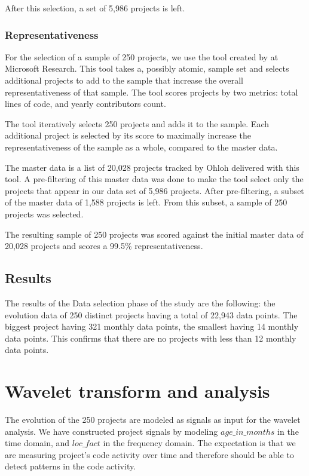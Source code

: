 After this selection, a set of 5,986 projects is left.

\subsubsection{Representativeness}
For the selection of a sample of 250 projects, we use the tool created by
\citet{nagappan} at Microsoft Research. This tool takes a, possibly atomic,
sample set and selects additional projects to add to the sample that increase
the overall representativeness of that sample. The tool scores projects by two
metrics: total lines of code, and yearly contributors count.

The tool iteratively selects 250 projects and adds it to the sample. Each
additional project is selected by its score to maximally increase the
representativeness of the sample as a whole, compared to the master data.

The master data is a list of 20,028 projects tracked by Ohloh delivered with
this tool. A pre-filtering of this master data was done to make the tool select
only the projects that appear in our data set of 5,986 projects. After
pre-filtering, a subset of the master data of 1,588 projects is left. From this
subset, a sample of 250 projects was selected.

The resulting sample of 250 projects was scored against the initial master data
of 20,028 projects and scores a 99.5\% representativeness.

\subsection{Results}
The results of the Data selection phase of the study are the following: the
evolution data of 250 distinct projects having a total of 22,943 data points.
The biggest project having 321 monthly data points, the smallest having 14
monthly data points. This confirms that there are no projects with less
than 12 monthly data points.

\section{Wavelet transform and analysis}
\label{method:dwt}

The evolution of the 250 projects are modeled as signals as input for the
wavelet analysis. We have constructed project signals by modeling
$age\_in\_months$ in the time domain, and $loc\_fact$ in the frequency domain.
The expectation is that we are measuring project's code activity over time and
therefore should be able to detect patterns in the code activity.

